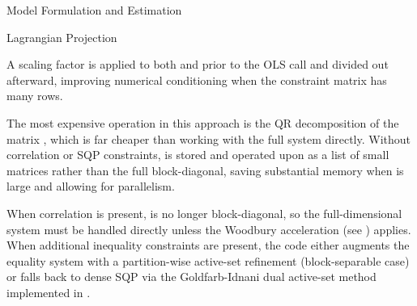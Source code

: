 \begin{Section}{Model Formulation and Estimation}
\begin{SubSection}{Lagrangian Projection}
\begin{enumerate}
\end{enumerate}


A scaling factor  is applied to both
 and  prior to the OLS call
and divided out afterward, improving numerical conditioning when the
constraint matrix has many rows.

The most expensive operation in this approach is the QR decomposition of the
 matrix ,
which is far cheaper than working with the full  system directly.
Without correlation or SQP constraints,  is stored and operated upon as a
list of  small  matrices rather than the full
 block-diagonal, saving substantial memory when 
is large and allowing for parallelism.

When correlation is present, 
is no longer block-diagonal, so the full-dimensional system must be handled
directly unless the Woodbury acceleration
(see ) applies.
When additional inequality constraints are present, the code either augments the equality system with a
partition-wise active-set refinement (block-separable case) or falls back to
dense SQP via the Goldfarb-Idnani dual active-set method implemented in
.
\end{SubSection}

\end{Section}
%
